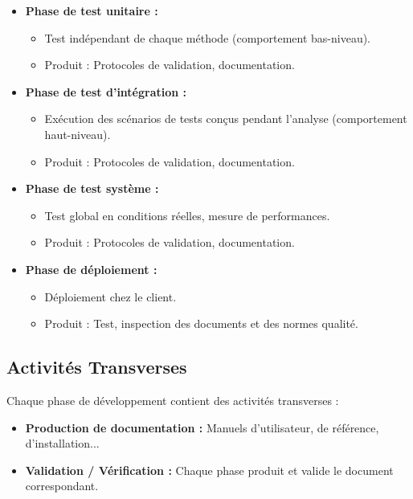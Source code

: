 \documentclass{article}
\begin{document}
\begin{itemize}
\begin{itemize}
\begin{itemize}
    \end{itemize}
    \item \textbf{Phase de test unitaire :}
    \begin{itemize}
        \item Test indépendant de chaque méthode (comportement bas-niveau).
        \item Produit : Protocoles de validation, documentation.
    \end{itemize}
     \item \textbf{Phase de test d'intégration :}
    \begin{itemize}
        \item Exécution des scénarios de tests conçus pendant l'analyse (comportement haut-niveau).
        \item Produit : Protocoles de validation, documentation.
    \end{itemize}
     \item \textbf{Phase de test système :}
    \begin{itemize}
        \item Test global en conditions réelles, mesure de performances.
        \item Produit : Protocoles de validation, documentation.
    \end{itemize}
     \item \textbf{Phase de déploiement :}
    \begin{itemize}
        \item Déploiement chez le client.
        \item Produit : Test, inspection des documents et des normes qualité.
    \end{itemize}
\end{itemize}

\subsection{Activités Transverses}

Chaque phase de développement contient des activités transverses :

\begin{itemize}
    \item \textbf{Production de documentation :} Manuels d'utilisateur, de référence, d'installation...
    \item \textbf{Validation / Vérification :} Chaque phase produit et valide le document correspondant.
\end{itemize}


\end{itemize}
\end{document}
